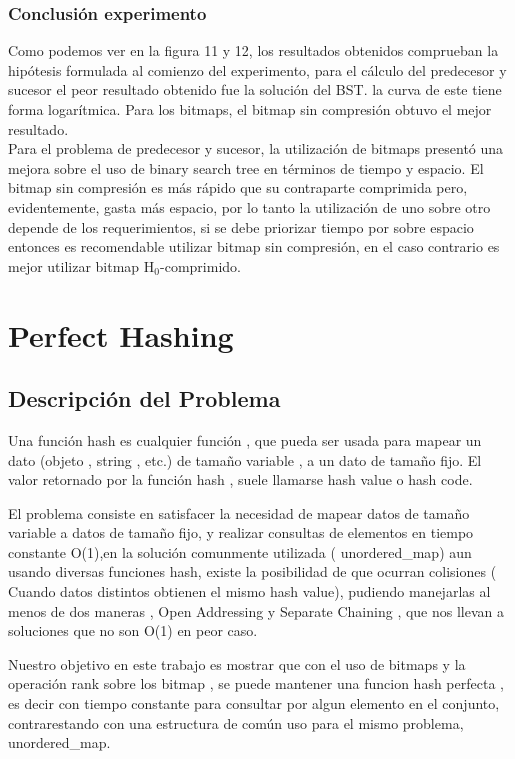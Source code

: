 \documentclass[11pt]{article}
\begin{document}
\subsubsection{Conclusión experimento}
Como podemos ver en la figura 11 y 12, los resultados obtenidos comprueban la hipótesis formulada al comienzo del experimento, para el cálculo del predecesor y sucesor el peor resultado obtenido fue la solución del BST. la curva de este tiene forma logarítmica. Para los bitmaps, el bitmap sin compresión obtuvo el mejor resultado.\\

Para el problema de predecesor y sucesor, la utilización de bitmaps presentó una mejora sobre el uso de binary search tree en términos de tiempo y espacio. El bitmap sin compresión es más rápido que su contraparte comprimida pero, evidentemente, gasta más espacio, por lo tanto la utilización de uno sobre otro depende de los requerimientos, si se debe priorizar tiempo por sobre espacio entonces es recomendable utilizar bitmap sin compresión, en el caso contrario es mejor utilizar bitmap H$_{0}$-comprimido.

\section{Perfect Hashing}
\subsection{Descripción del Problema}
Una función hash es cualquier función , que pueda ser usada para mapear un dato
(objeto , string , etc.) de tamaño variable , a un dato de tamaño fijo. El valor retornado por la función hash , suele llamarse hash value o hash code.


El problema consiste en satisfacer la necesidad de mapear datos de tamaño variable a datos de tamaño fijo, y realizar consultas de elementos en tiempo constante O(1),en la solución comunmente utilizada ( unordered\_map) aun usando diversas funciones hash, existe la posibilidad de que ocurran colisiones ( Cuando datos distintos obtienen el mismo hash value), pudiendo manejarlas al menos de dos maneras , Open Addressing y Separate Chaining , que nos llevan a soluciones que no son O(1) en peor caso.


Nuestro objetivo en este trabajo es mostrar que con el uso de bitmaps y la operación rank sobre los bitmap , se puede mantener una funcion hash perfecta , es decir con tiempo constante para consultar por algun elemento en el conjunto, contrarestando con una estructura de común uso para el mismo problema, unordered\_map. 
\end{document}
